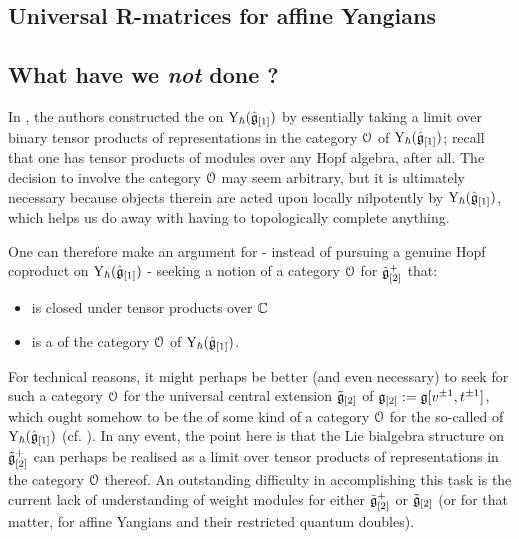         \subsection{Universal R-matrices for affine Yangians}

        \subsection{What have we \textit{not} done ?}
            In \cite{guay_nakajima_wendlandt_affine_yangian_coproduct}, the authors constructed the  on $\mathrm{Y}_{\hbar}(\hat{\mathfrak{g}}_{[1]})$ by essentially taking a limit over binary tensor products of representations in the category $\mathcal{O}$ of $\mathrm{Y}_{\hbar}(\hat{\mathfrak{g}}_{[1]})$; recall that one has tensor products of modules over any Hopf algebra, after all. The decision to involve the category $\mathcal{O}$ may seem arbitrary, but it is ultimately necessary because objects therein are acted upon locally nilpotently by $\mathrm{Y}_{\hbar}(\hat{\mathfrak{g}}_{[1]})$, which helps us do away with having to topologically complete anything. 
        
            One can therefore make an argument for - instead of pursuing a genuine Hopf coproduct on $\mathrm{Y}_{\hbar}(\hat{\mathfrak{g}}_{[1]})$ - seeking a notion of a category $\mathcal{O}$ for $\tilde{\mathfrak{g}}_{[2]}^+$ that:
            \begin{itemize}
                \item is closed under tensor products over $\mathbb{C}$
                \item is a  of the category $\mathcal{O}$ of $\mathrm{Y}_{\hbar}(\hat{\mathfrak{g}}_{[1]})$.
            \end{itemize}
            For technical reasons, it might perhaps be better (and even necessary) to seek for such a category $\mathcal{O}$ for the universal central extension $\tilde{\mathfrak{g}}_{[2]}$ of $\mathfrak{g}_{[2]} := \mathfrak{g}[v^{\pm 1}, t^{\pm 1}]$, which ought somehow to be the  of some kind of a category $\mathcal{O}$ for the so-called  of $\mathrm{Y}_{\hbar}(\hat{\mathfrak{g}}_{[1]})$ (cf. \cite{wendlandt_restricted_quantum_doubles_of_yangians}). In any event, the point here is that the Lie bialgebra structure on $\tilde{\mathfrak{g}}_{[2]}^+$ can perhaps be realised as a limit over tensor products of representations in the category $\mathcal{O}$ thereof. An outstanding difficulty in accomplishing this task is the current lack of understanding of weight modules for either $\tilde{\mathfrak{g}}_{[2]}^+$ or $\tilde{\mathfrak{g}}_{[2]}$ (or for that matter, for affine Yangians and their restricted quantum doubles).

